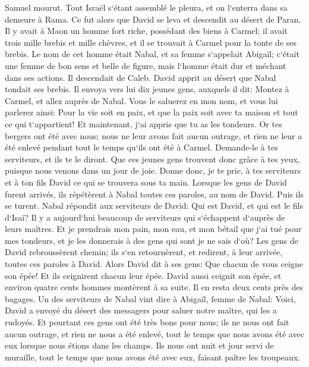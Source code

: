 \verse Samuel mourut. Tout Israël s`étant assemblé le pleura, et on l`enterra dans sa demeure à Rama. Ce fut alors que David se leva et descendit au désert de Paran. 
\verse Il y avait à Maon un homme fort riche, possédant des biens à Carmel; il avait trois mille brebis et mille chèvres, et il se trouvait à Carmel pour la tonte de ses brebis. 
\verse Le nom de cet homme était Nabal, et sa femme s`appelait Abigaïl; c`était une femme de bon sens et belle de figure, mais l`homme était dur et méchant dans ses actions. Il descendait de Caleb. 
\verse David apprit au désert que Nabal tondait ses brebis. 
\verse Il envoya vers lui dix jeunes gens, auxquels il dit: Montez à Carmel, et allez auprès de Nabal. Vous le saluerez en mon nom, 
\verse et vous lui parlerez ainsi: Pour la vie soit en paix, et que la paix soit avec ta maison et tout ce qui t`appartient! 
\verse Et maintenant, j`ai appris que tu as les tondeurs. Or tes bergers ont été avec nous; nous ne leur avons fait aucun outrage, et rien ne leur a été enlevé pendant tout le temps qu`ils ont été à Carmel. 
\verse Demande-le à tes serviteurs, et ils te le diront. Que ces jeunes gens trouvent donc grâce à tes yeux, puisque nous venons dans un jour de joie. Donne donc, je te prie, à tes serviteurs et à ton fils David ce qui se trouvera sous ta main. 
\verse Lorsque les gens de David furent arrivés, ils répétèrent à Nabal toutes ces paroles, au nom de David. Puis ils se turent. 
\verse Nabal répondit aux serviteurs de David: Qui est David, et qui est le fils d`Isaï? Il y a aujourd`hui beaucoup de serviteurs qui s`échappent d`auprès de leurs maîtres. 
\verse Et je prendrais mon pain, mon eau, et mon bétail que j`ai tué pour mes tondeurs, et je les donnerais à des gens qui sont je ne sais d`où? 
\verse Les gens de David rebroussèrent chemin; ils s`en retournèrent, et redirent, à leur arrivée, toutes ces paroles à David. 
\verse Alors David dit à ses gens: Que chacun de vous ceigne son épée! Et ils ceignirent chacun leur épée. David aussi ceignit son épée, et environ quatre cents hommes montèrent à sa suite. Il en resta deux cents près des bagages. 
\verse Un des serviteurs de Nabal vint dire à Abigaïl, femme de Nabal: Voici, David a envoyé du désert des messagers pour saluer notre maître, qui les a rudoyés. 
\verse Et pourtant ces gens ont été très bons pour nous; ils ne nous ont fait aucun outrage, et rien ne nous a été enlevé, tout le temps que nous avons été avec eux lorsque nous étions dans les champs. 
\verse Ils nous ont nuit et jour servi de muraille, tout le temps que nous avons été avec eux, faisant paître les troupeaux. 
